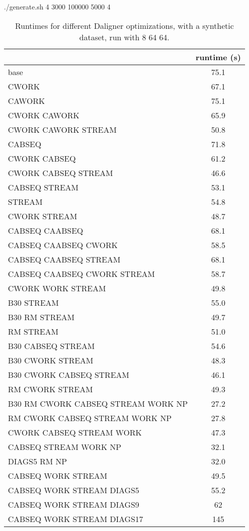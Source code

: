 \documentclass[../main/thesis.tex]{subfiles}
\begin{document}
./generate.sh 4 3000 100000 5000 4
\begin{table}
\centering
\caption{Runtimes for different Daligner optimizations, with a synthetic dataset, run with 8 64 64.}
\begin{tabular}{l c}
& runtime (s) \\ \hline
base & 75.1 \\
CWORK & 67.1 \\
CAWORK & 75.1 \\
CWORK CAWORK & 65.9 \\
CWORK CAWORK STREAM & 50.8 \\ \hline
CABSEQ & 71.8 \\
CWORK CABSEQ & 61.2 \\
CWORK CABSEQ STREAM & 46.6 \\
CABSEQ STREAM & 53.1 \\
STREAM & 54.8 \\ \hline
CWORK STREAM & 48.7 \\
CABSEQ CAABSEQ & 68.1 \\
CABSEQ CAABSEQ CWORK & 58.5 \\
CABSEQ CAABSEQ STREAM & 68.1 \\
CABSEQ CAABSEQ CWORK STREAM & 58.7 \\
CWORK WORK STREAM & 49.8 \\ \hline \hline
B30 STREAM & 55.0 \\
B30 RM STREAM & 49.7 \\
RM STREAM & 51.0 \\
B30 CABSEQ STREAM & 54.6 \\
B30 CWORK STREAM & 48.3 \\
B30 CWORK CABSEQ STREAM & 46.1 \\
RM CWORK STREAM & 49.3 \\ \hline
B30 RM CWORK CABSEQ STREAM WORK NP & 27.2 \\
RM CWORK CABSEQ STREAM WORK NP & 27.8 \\
CWORK CABSEQ STREAM WORK & 47.3 \\
CABSEQ STREAM WORK NP & 32.1 \\
DIAGS5 RM NP & 32.0 \\ \hline \hline
CABSEQ WORK STREAM & 49.5 \\
CABSEQ WORK STREAM DIAGS5 & 55.2 \\
CABSEQ WORK STREAM DIAGS9 & 62 \\
CABSEQ WORK STREAM DIAGS17 & 145 \\
\end{tabular}
\end{table}
\end{document}
